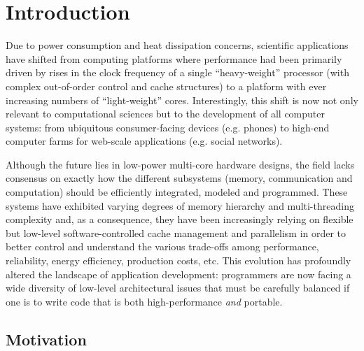 \documentclass{sig-alternate}
\begin{document}
\section{Introduction}



Due to power consumption and heat dissipation concerns, scientific applications
have shifted from computing platforms where performance had been primarily
driven by rises in the clock frequency of a single ``heavy-weight'' processor
(with complex out-of-order control and cache structures) to a platform with
ever increasing numbers of ``light-weight'' cores. Interestingly, this shift is
now not only relevant to computational sciences but to the development of all
computer systems: from ubiquitous consumer-facing devices (e.g. phones) to
high-end computer farms for web-scale applications (e.g. social networks).


Although the future lies in low-power multi-core hardware designs, the field
lacks consensus on exactly how the different subsystems (memory,
communication and computation) should be efficiently integrated, modeled and
programmed. These systems have exhibited varying degrees of memory hierarchy
and multi-threading complexity and, as a consequence, they have been
increasingly relying on flexible but low-level software-controlled cache
management and parallelism \citep{asanovic2006landscape} in order to better
control and understand the various trade-offs among performance, reliability,
energy efficiency, production costs, etc. This evolution has profoundly
altered the landscape of application development: programmers are now
facing a wide diversity of low-level architectural issues
that must be carefully balanced if one is to write code that is both
high-performance \emph{and} portable.

\subsection{Motivation}

\end{document}
